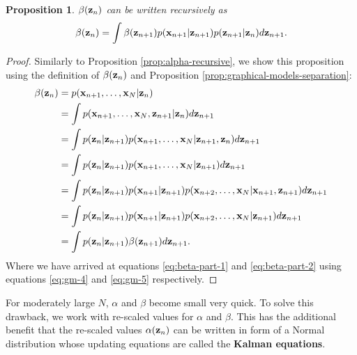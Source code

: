 \documentclass[11pt]{article}
\numberwithin{equation}{section}
\newcommand{\x}{{\bf x}}
\newcommand{\z}{{\bf z}}
\newtheorem{proposition}{Proposition}[section]
\begin{document}
\begin{proposition} \label{prop:beta-recursive}
	$\beta(\z_n)$ can be written recursively as
	\begin{equation}
		\beta(\z_n) = \int  \beta(\z_{n+1})p(\x_{n+1}\vert \z_{n+1}) p(\z_{n+1}\vert \z_n) d\z_{n+1}.
	\end{equation} 
\end{proposition}

\begin{proof}
	Similarly to Proposition \ref{prop:alpha-recursive}, we show this proposition using the definition of $\beta(\z_n)$ and Proposition \ref{prop:graphical-models-separation}:
	\begin{align}
		\beta(\z_n) &= p(\x_{n+1}, \ldots, \x_N \vert \z_n)\\
		&= \int p(\x_{n+1}, \ldots, \x_N, \z_{n+1} \vert \z_n) d\z_{n+1} \\
		&= \int p(\z_n \vert \z_{n+1}) p(\x_{n+1}, \ldots, \x_N \vert \z_{n+1}, \z_n) d\z_{n+1} \\
		&= \int p(\z_n \vert \z_{n+1}) p(\x_{n+1}, \ldots, \x_N \vert \z_{n+1}) d\z_{n+1} \label{eq:beta-part-1} \\
		&= \int p(\z_n \vert \z_{n+1}) p(\x_{n+1} \vert \z_{n+1}) p(\x_{n+2}, \ldots, \x_N \vert \x_{n+1}, \z_{n+1}) d\z_{n+1} \\
		&= \int p(\z_n \vert \z_{n+1}) p(\x_{n+1} \vert \z_{n+1}) p(\x_{n+2}, \ldots, \x_N \vert \z_{n+1}) d\z_{n+1} \label{eq:beta-part-2}\\
		&= \int p(\z_n \vert \z_{n+1}) \beta(\z_{n+1}) d\z_{n+1}.
	\end{align}
	Where we have arrived at equations \eqref{eq:beta-part-1} and \eqref{eq:beta-part-2} using equations \eqref{eq:gm-4} and \eqref{eq:gm-5} respectively.
\end{proof}

For moderately large $N$, $\alpha$ and $\beta$ become small very quick. To solve this drawback, we work with re-scaled values for $\alpha$ and $\beta$. This has the additional benefit that the re-scaled values $\alpha(\z_n)$ can be written in form of a Normal distribution whose updating equations are  called the \textbf{Kalman equations}.

\end{document}
